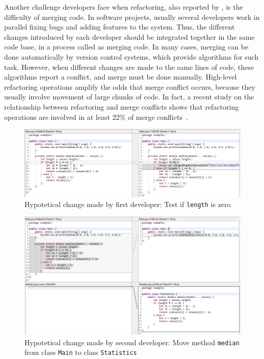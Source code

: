 Another challenge developers face when refactoring, also reported by \cite{kim-tse-2014}, is the difficulty of merging code.
In software projects, usually several developers work in parallel fixing bugs and adding features to the system.
Thus, the different changes introduced by each developer should be integrated together in the same code base, in a process called as merging code.
In many cases, merging can be done automatically by version control systems, which provide algorithms for such task.
However, when different changes are made to the same lines of code, these algorithms report a conflict, and merge must be done manually.
High-level refactoring operations amplify the odds that merge conflict occurs, because they usually involve movement of large chunks of code.
In fact, a recent study on the relationship between refactoring and merge conflicts shows that refactoring operations are involved in at least 22\% of merge conflicts~\citep{mahmoudi2019refactorings}.

\begin{figure}[htbp]
\centering
\includegraphics[width=\linewidth]{img/merge-ex-diff1.png}
\caption{Hypotetical change made by first developer: Test if \texttt{length} is zero}
\label{FigMergeExDiff1}
\end{figure}

\begin{figure}[htbp]
\centering
\includegraphics[width=\linewidth]{img/merge-ex-diff2.png}
\caption{Hypotetical change made by second developer: Move method \texttt{median} from class \texttt{Main} to class \texttt{Statistics}}
\label{FigMergeExDiff2}
\end{figure}

